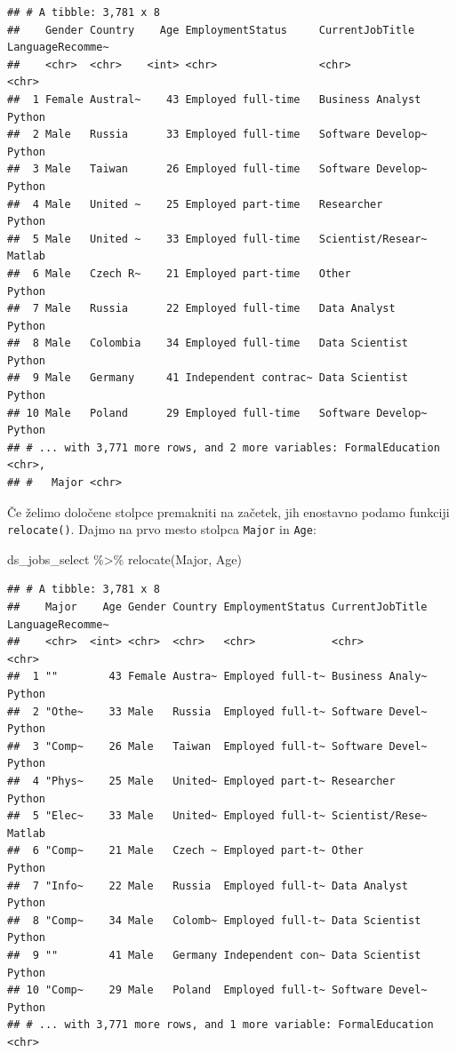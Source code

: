 \documentclass[
]{book}
\newenvironment{Shaded}{\begin{snugshade}}{\end{snugshade}}
\newcommand{\FunctionTok}[1]{\textcolor[rgb]{0.00,0.00,0.00}{#1}}
\newcommand{\NormalTok}[1]{#1}
\newcommand{\SpecialCharTok}[1]{\textcolor[rgb]{0.00,0.00,0.00}{#1}}
\begin{document}
\begin{verbatim}
## # A tibble: 3,781 x 8
##    Gender Country    Age EmploymentStatus     CurrentJobTitle   LanguageRecomme~
##    <chr>  <chr>    <int> <chr>                <chr>             <chr>           
##  1 Female Austral~    43 Employed full-time   Business Analyst  Python          
##  2 Male   Russia      33 Employed full-time   Software Develop~ Python          
##  3 Male   Taiwan      26 Employed full-time   Software Develop~ Python          
##  4 Male   United ~    25 Employed part-time   Researcher        Python          
##  5 Male   United ~    33 Employed full-time   Scientist/Resear~ Matlab          
##  6 Male   Czech R~    21 Employed part-time   Other             Python          
##  7 Male   Russia      22 Employed full-time   Data Analyst      Python          
##  8 Male   Colombia    34 Employed full-time   Data Scientist    Python          
##  9 Male   Germany     41 Independent contrac~ Data Scientist    Python          
## 10 Male   Poland      29 Employed full-time   Software Develop~ Python          
## # ... with 3,771 more rows, and 2 more variables: FormalEducation <chr>,
## #   Major <chr>
\end{verbatim}

Če želimo določene stolpce premakniti na začetek, jih enostavno podamo funkciji \texttt{relocate()}. Dajmo na prvo mesto stolpca \texttt{Major} in \texttt{Age}:

\begin{Shaded}
\begin{Highlighting}[]
\NormalTok{ds\_jobs\_select }\SpecialCharTok{\%\textgreater{}\%}
  \FunctionTok{relocate}\NormalTok{(Major, Age)}
\end{Highlighting}
\end{Shaded}

\begin{verbatim}
## # A tibble: 3,781 x 8
##    Major    Age Gender Country EmploymentStatus CurrentJobTitle LanguageRecomme~
##    <chr>  <int> <chr>  <chr>   <chr>            <chr>           <chr>           
##  1 ""        43 Female Austra~ Employed full-t~ Business Analy~ Python          
##  2 "Othe~    33 Male   Russia  Employed full-t~ Software Devel~ Python          
##  3 "Comp~    26 Male   Taiwan  Employed full-t~ Software Devel~ Python          
##  4 "Phys~    25 Male   United~ Employed part-t~ Researcher      Python          
##  5 "Elec~    33 Male   United~ Employed full-t~ Scientist/Rese~ Matlab          
##  6 "Comp~    21 Male   Czech ~ Employed part-t~ Other           Python          
##  7 "Info~    22 Male   Russia  Employed full-t~ Data Analyst    Python          
##  8 "Comp~    34 Male   Colomb~ Employed full-t~ Data Scientist  Python          
##  9 ""        41 Male   Germany Independent con~ Data Scientist  Python          
## 10 "Comp~    29 Male   Poland  Employed full-t~ Software Devel~ Python          
## # ... with 3,771 more rows, and 1 more variable: FormalEducation <chr>
\end{verbatim}
\end{document}
